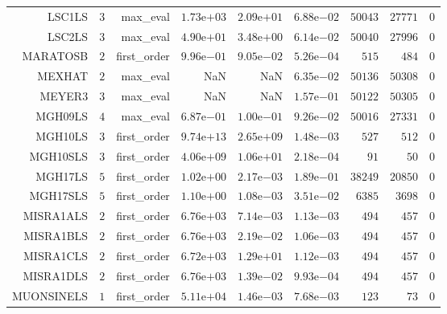 \begin{longtable}{rrrrrrrrr}
LSC1LS & \(     3\) & max\_eval & \( 1.73\)e\(+03\) & \( 2.09\)e\(+01\) & \( 6.88\)e\(-02\) & \( 50043\) & \( 27771\) & \(     0\) \\
LSC2LS & \(     3\) & max\_eval & \( 4.90\)e\(+01\) & \( 3.48\)e\(+00\) & \( 6.14\)e\(-02\) & \( 50040\) & \( 27996\) & \(     0\) \\
MARATOSB & \(     2\) & first\_order & \( 9.96\)e\(-01\) & \( 9.05\)e\(-02\) & \( 5.26\)e\(-04\) & \(   515\) & \(   484\) & \(     0\) \\
MEXHAT & \(     2\) & max\_eval &       NaN &       NaN & \( 6.35\)e\(-02\) & \( 50136\) & \( 50308\) & \(     0\) \\
MEYER3 & \(     3\) & max\_eval &       NaN &       NaN & \( 1.57\)e\(-01\) & \( 50122\) & \( 50305\) & \(     0\) \\
MGH09LS & \(     4\) & max\_eval & \( 6.87\)e\(-01\) & \( 1.00\)e\(-01\) & \( 9.26\)e\(-02\) & \( 50016\) & \( 27331\) & \(     0\) \\
MGH10LS & \(     3\) & first\_order & \( 9.74\)e\(+13\) & \( 2.65\)e\(+09\) & \( 1.48\)e\(-03\) & \(   527\) & \(   512\) & \(     0\) \\
MGH10SLS & \(     3\) & first\_order & \( 4.06\)e\(+09\) & \( 1.06\)e\(+01\) & \( 2.18\)e\(-04\) & \(    91\) & \(    50\) & \(     0\) \\
MGH17LS & \(     5\) & first\_order & \( 1.02\)e\(+00\) & \( 2.17\)e\(-03\) & \( 1.89\)e\(-01\) & \( 38249\) & \( 20850\) & \(     0\) \\
MGH17SLS & \(     5\) & first\_order & \( 1.10\)e\(+00\) & \( 1.08\)e\(-03\) & \( 3.51\)e\(-02\) & \(  6385\) & \(  3698\) & \(     0\) \\
MISRA1ALS & \(     2\) & first\_order & \( 6.76\)e\(+03\) & \( 7.14\)e\(-03\) & \( 1.13\)e\(-03\) & \(   494\) & \(   457\) & \(     0\) \\
MISRA1BLS & \(     2\) & first\_order & \( 6.76\)e\(+03\) & \( 2.19\)e\(-02\) & \( 1.06\)e\(-03\) & \(   494\) & \(   457\) & \(     0\) \\
MISRA1CLS & \(     2\) & first\_order & \( 6.72\)e\(+03\) & \( 1.29\)e\(+01\) & \( 1.12\)e\(-03\) & \(   494\) & \(   457\) & \(     0\) \\
MISRA1DLS & \(     2\) & first\_order & \( 6.76\)e\(+03\) & \( 1.39\)e\(-02\) & \( 9.93\)e\(-04\) & \(   494\) & \(   457\) & \(     0\) \\
MUONSINELS & \(     1\) & first\_order & \( 5.11\)e\(+04\) & \( 1.46\)e\(-03\) & \( 7.68\)e\(-03\) & \(   123\) & \(    73\) & \(     0\) \\

\end{longtable}
